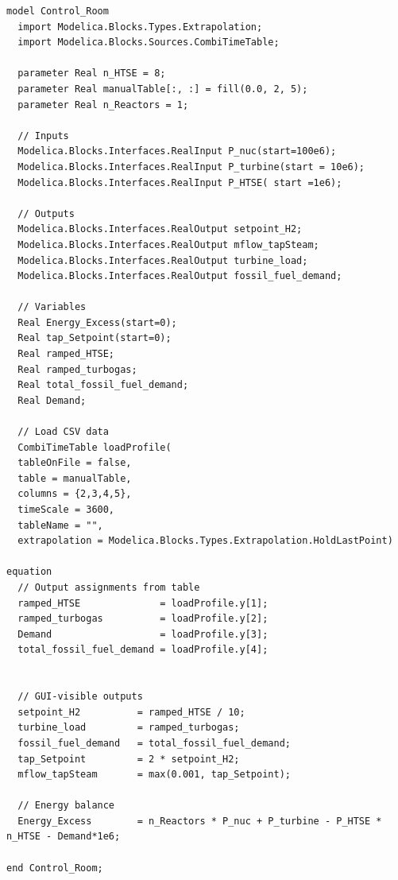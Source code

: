 \newpage
\begin{lstlisting}[language=Modelica, caption= Control Room]
  model Control_Room
  import Modelica.Blocks.Types.Extrapolation;
  import Modelica.Blocks.Sources.CombiTimeTable;

  parameter Real n_HTSE = 8;
  parameter Real manualTable[:, :] = fill(0.0, 2, 5);
  parameter Real n_Reactors = 1;

  // Inputs
  Modelica.Blocks.Interfaces.RealInput P_nuc(start=100e6);
  Modelica.Blocks.Interfaces.RealInput P_turbine(start = 10e6);
  Modelica.Blocks.Interfaces.RealInput P_HTSE( start =1e6);

  // Outputs
  Modelica.Blocks.Interfaces.RealOutput setpoint_H2;
  Modelica.Blocks.Interfaces.RealOutput mflow_tapSteam;
  Modelica.Blocks.Interfaces.RealOutput turbine_load;
  Modelica.Blocks.Interfaces.RealOutput fossil_fuel_demand;

  // Variables
  Real Energy_Excess(start=0);
  Real tap_Setpoint(start=0);
  Real ramped_HTSE;
  Real ramped_turbogas;
  Real total_fossil_fuel_demand;
  Real Demand;

  // Load CSV data
  CombiTimeTable loadProfile(
  tableOnFile = false,
  table = manualTable,
  columns = {2,3,4,5},
  timeScale = 3600,
  tableName = "",
  extrapolation = Modelica.Blocks.Types.Extrapolation.HoldLastPoint)

equation 
  // Output assignments from table
  ramped_HTSE              = loadProfile.y[1];
  ramped_turbogas          = loadProfile.y[2];
  Demand                   = loadProfile.y[3];
  total_fossil_fuel_demand = loadProfile.y[4];


  // GUI-visible outputs
  setpoint_H2          = ramped_HTSE / 10;
  turbine_load         = ramped_turbogas;
  fossil_fuel_demand   = total_fossil_fuel_demand;
  tap_Setpoint         = 2 * setpoint_H2;
  mflow_tapSteam       = max(0.001, tap_Setpoint);

  // Energy balance
  Energy_Excess        = n_Reactors * P_nuc + P_turbine - P_HTSE * n_HTSE - Demand*1e6;

end Control_Room;

\end{lstlisting}
